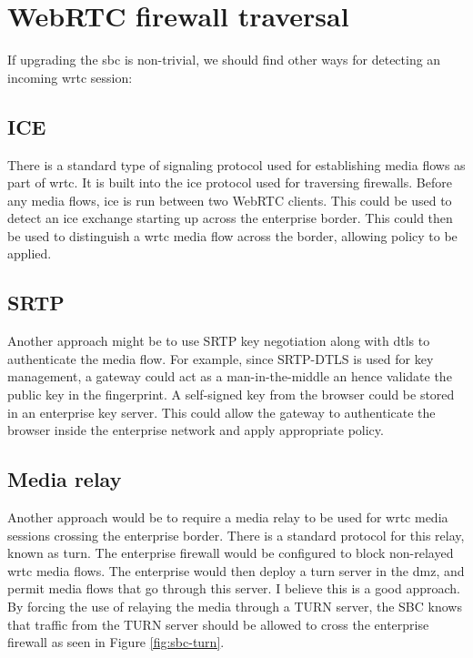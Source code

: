 \section{WebRTC firewall traversal}
If upgrading the \gls{sbc} is non-trivial, we should find other ways for detecting an incoming \gls{wrtc} session:

\subsection{ICE}
There is a standard type of signaling protocol used for establishing media flows as part of \gls{wrtc}. It is built into the \gls{ice} protocol used for traversing firewalls. Before any media flows, \gls{ice} is run between two WebRTC clients. This could be used to detect an \gls{ice} exchange starting up across the enterprise border. This could then be used to distinguish a \gls{wrtc} media flow across the border, allowing policy to be applied\cite{johnston_taking_2013}.

\subsection{SRTP}
Another approach might be to use SRTP key negotiation along with \gls{dtls} to authenticate the media flow. For example, since SRTP-DTLS is used for key management, a gateway could act as a man-in-the-middle an hence validate the public key in the fingerprint. A self-signed key from the browser could be stored in an enterprise key server. This could allow the gateway to authenticate the browser inside the enterprise network and apply appropriate policy\cite{johnston_taking_2013}.

\subsection{Media relay}
Another approach would be to require a media relay to be used for \gls{wrtc} media sessions crossing the enterprise border. There is a standard protocol for this relay, known as \gls{turn}. The enterprise firewall would be configured to block non-relayed \gls{wrtc} media flows. The enterprise would then deploy a \gls{turn} server in the \gls{dmz}, and permit media flows that go through this server\cite{johnston_taking_2013}. I believe this is a good approach. By forcing the use of relaying the media through a TURN server, the SBC knows that traffic from the TURN server should be allowed to cross the enterprise firewall as seen in Figure \ref{fig:sbc-turn}.

